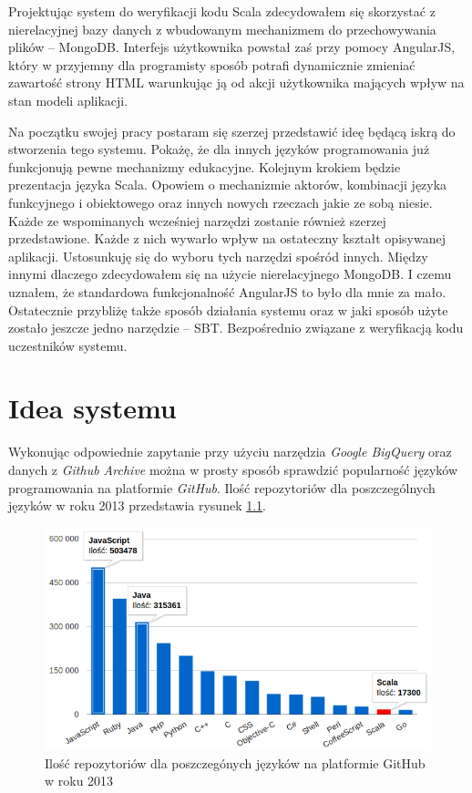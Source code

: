 \documentclass[brudnopis]{xmgr}
\begin{document}
Projektując system do weryfikacji kodu Scala zdecydowałem się skorzystać z nierelacyjnej bazy danych z wbudowanym mechanizmem do przechowywania plików -- MongoDB. Interfejs użytkownika powstał zaś przy pomocy AngularJS, który w przyjemny dla programisty sposób  potrafi dynamicznie zmieniać zawartość strony HTML warunkując ją od akcji użytkownika mających wpływ na stan modeli aplikacji.

\medskip Na początku swojej pracy postaram się szerzej przedstawić ideę będącą iskrą do stworzenia tego systemu. Pokażę, że dla innych języków programowania już funkcjonują pewne mechanizmy edukacyjne. Kolejnym krokiem będzie prezentacja języka Scala. Opowiem o mechanizmie aktorów, kombinacji języka funkcyjnego i obiektowego oraz innych nowych rzeczach jakie ze sobą niesie. Każde ze wspominanych wcześniej narzędzi zostanie również szerzej przedstawione. Każde z nich wywarło wpływ na ostateczny kształt opisywanej aplikacji. Ustosunkuję się do wyboru tych narzędzi spośród innych. Między innymi dlaczego zdecydowałem się na użycie nierelacyjnego MongoDB. I czemu uznałem, że standardowa funkcjonalność AngularJS to było dla mnie za mało. Ostatecznie przybliżę także sposób działania systemu oraz w jaki sposób użyte zostało jeszcze jedno narzędzie -- SBT. Bezpośrednio związane z weryfikacją kodu uczestników systemu. 

\chapter{Idea systemu}

Wykonując odpowiednie zapytanie przy użyciu narzędzia \textit{Google BigQuery} oraz danych z \textit{Github Archive} można w prosty sposób sprawdzić popularność języków programowania na platformie \textit{GitHub}. Ilość repozytoriów dla poszczególnych języków w roku 2013  przedstawia rysunek \ref{RYS.1}. 

\begin{figure}[!tbh]
\centering 
\includegraphics[width=.95\hsize]{fig/top_github_languages_2013}
\caption{Ilość repozytoriów dla poszczegónych języków na platformie GitHub w roku 2013 \label{RYS.1}}
\end{figure}
\end{document}
